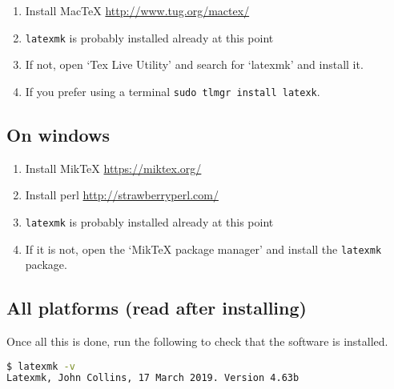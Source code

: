 \begin{enumerate}
    \item Install MacTeX \url{http://www.tug.org/mactex/}
    \item \verb|latexmk| is probably installed already at this point
    \item If not, open `Tex Live Utility' and search for `latexmk' and install it.
    \item If you prefer using a terminal \verb|sudo tlmgr install latexk|.
\end{enumerate}

\subsection*{On windows}

\begin{enumerate}
    \item Install MikTeX \url{https://miktex.org/}
    \item Install perl \url{http://strawberryperl.com/}
    \item \verb|latexmk| is probably installed already at this point
    \item If it is not, open the `MikTeX package manager' and install the \verb|latexmk| package.
\end{enumerate}

\subsection*{All platforms (read after installing)}

Once all this is done, run the following to check that the software is installed.

\begin{lstlisting}[language=bash]
$ latexmk -v
Latexmk, John Collins, 17 March 2019. Version 4.63b
\end{lstlisting}



